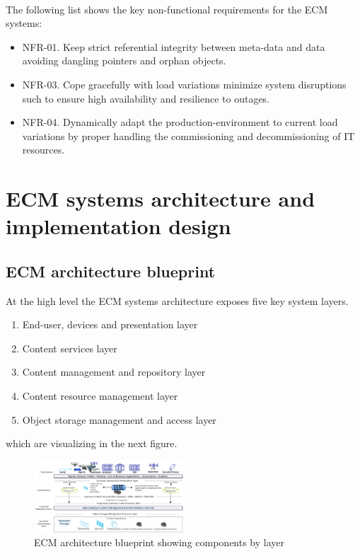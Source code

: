 \documentclass[EPiC]{easychair} %
\begin{document}
\paragraph{} The following list shows the key non-functional requirements for the ECM systems:

\begin{itemize}
    \item NFR-01. Keep strict referential integrity between meta-data and data avoiding dangling pointers and orphan objects.
    \item NFR-03. Cope gracefully with load variations minimize system disruptions such to ensure high availability and resilience to outages. 
    \item NFR-04. Dynamically adapt the production-environment to current load variations by proper handling the commissioning and decommissioning of IT resources.
\end{itemize}


\section{ECM systems architecture and implementation design}
\label{sect:architecture-design}
\subsection{ECM architecture blueprint }

At the high level the ECM systems architecture exposes five key system layers.

\begin{enumerate}
    \item  End-user, devices and presentation layer
    \item  Content services layer
    \item  Content management and repository layer
    \item  Content resource management layer
    \item  Object storage management and access layer 		
\end{enumerate}

which are visualizing in the next figure.

 \begin{figure}[hbt!]
     \centering
	\includegraphics[width=0.5\textwidth]{pics/ECMpic03}
     \caption{ECM architecture blueprint showing components by layer}
     \label{fig:architecture-blueprint}
 \end{figure}
\end{document}
